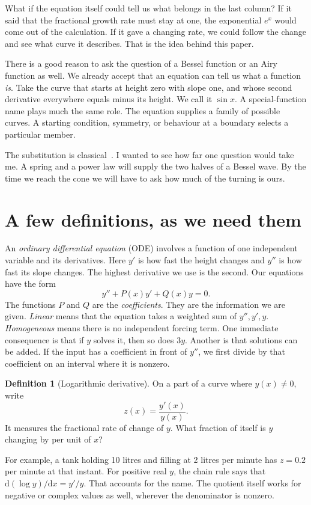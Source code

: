 \documentclass[11pt,a4paper]{amsart}
\newcommand{\dif}{\mathrm{d}}
\theoremstyle{definition}
\newtheorem{definition}[theorem]{Definition}
\theoremstyle{remark}
\begin{document}
What if the equation itself could tell us what belongs in the last column? If it said that the fractional growth rate must stay at one, the exponential \(e^x\) would come out of the calculation. If it gave a changing rate, we could follow the change and see what curve it describes. That is the idea behind this paper.

There is a good reason to ask the question of a Bessel function or an Airy function as well. We already accept that an equation can tell us what a function \emph{is}. Take the curve that starts at height zero with slope one, and whose second derivative everywhere equals minus its height. We call it \(\sin x\). A special-function name plays much the same role. The equation supplies a family of possible curves. A starting condition, symmetry, or behaviour at a boundary selects a particular member.

The substitution is classical~\cite{Ince1956,Reid1972}. I wanted to see how far one question would take me. A spring and a power law will supply the two halves of a Bessel wave. By the time we reach the cone we will have to ask how much of the turning is ours.

\section{A few definitions, as we need them}
An \emph{ordinary differential equation} (ODE) involves a function of one independent variable and its derivatives. Here \(y'\) is how fast the height changes and \(y''\) is how fast its slope changes. The highest derivative we use is the second. Our equations have the form
\begin{equation}\label{eq:usual}
 y''+P(x)y'+Q(x)y=0 .
\end{equation}
The functions \(P\) and \(Q\) are the \emph{coefficients}. They are the information we are given. \emph{Linear} means that the equation takes a weighted sum of \(y'',y',y\). \emph{Homogeneous} means there is no independent forcing term. One immediate consequence is that if \(y\) solves it, then so does \(3y\). Another is that solutions can be added. If the input has a coefficient in front of \(y''\), we first divide by that coefficient on an interval where it is nonzero.

\begin{definition}[Logarithmic derivative]
On a part of a curve where \(y(x)\ne0\), write
\[
 z(x)=\frac{y'(x)}{y(x)}.
\]
It measures the fractional rate of change of \(y\). What fraction of itself is \(y\) changing by per unit of \(x\)?
\end{definition}
For example, a tank holding 10 litres and filling at 2 litres per minute has \(z=0.2\) per minute at that instant. For positive real \(y\), the chain rule says that \(\dif(\log y)/\dif x=y'/y\). That accounts for the name. The quotient itself works for negative or complex values as well, wherever the denominator is nonzero.
\end{document}
